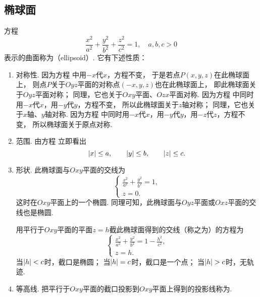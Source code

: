 \subsection{椭球面}
方程\begin{equation}\label{equation:解析几何.椭球面的一般方程}
	\frac{x^2}{a^2}+\frac{y^2}{b^2}+\frac{z^2}{c^2}=1,
	\quad a,b,c>0
\end{equation}
表示的曲面称为（ellipsoid）.
它有下述性质：
\begin{enumerate}
	\item 对称性.
	因为方程  中用\(-x\)代\(x\)，方程不变，
	于是若点\(P(x,y,z)\)在此椭球面上，
	则点\(P\)关于\(Oyz\)平面的对称点\((-x,y,z)\)也在此椭球面上，
	即此椭球面关于\(Oyz\)平面对称；
	同理，它也关于\(Oxy\)平面、\(Ozx\)平面对称.
	因为方程  中同时用\(-x\)代\(x\)，用\(-y\)代\(y\)，方程不变，
	所以此椭球面关于\(z\)轴对称；
	同理，它也关于\(x\)轴、\(y\)轴对称.
	因为方程  中同时用\(-x\)代\(x\)，用\(-y\)代\(y\)，用\(-z\)代\(z\)，方程不变，
	所以椭球面关于原点对称.

	\item 范围.
	由方程  立即看出\begin{equation*}
		\abs{x} \leq a, \qquad
		\abs{y} \leq b, \qquad
		\abs{z} \leq c.
	\end{equation*}

	\item 形状.
	此椭球面与\(Oxy\)平面的交线为\begin{equation*}
		\left\{ \begin{array}{l}
			\frac{x^2}{a^2}+\frac{y^2}{b^2}=1, \\
			z = 0.
		\end{array} \right.
	\end{equation*}
	这时在\(Oxy\)平面上的一个椭圆.
	同理可知，此椭球面与\(Oyz\)平面或\(Oxz\)平面的交线也是椭圆.

	用平行于\(Oxy\)平面的平面\(z = h\)截此椭球面得到的交线（称之为）的方程为\begin{equation*}
		\left\{ \begin{array}{l}
			\frac{x^2}{a^2}+\frac{y^2}{b^2}=1-\frac{h^2}{c^2}, \\
			z = h.
		\end{array} \right.
	\end{equation*}
	当\(\abs{h} < c\)时，截口是椭圆；
	当\(\abs{h} = c\)时，截口是一个点；
	当\(\abs{h} > c\)时，无轨迹.

	\item 等高线.
	把平行于\(Oxy\)平面的截口投影到\(Oxy\)平面上得到的投影线称为.
\end{enumerate}

